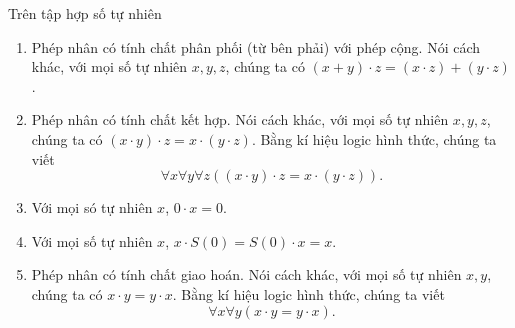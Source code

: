 \begin{theorem}\label{theorem:property-of-natural-numbers-multiplication}
	Trên tập hợp số tự nhiên
	\begin{enumerate}[label={(\roman*)}]
		\item Phép nhân có tính chất phân phối (từ bên phải) với phép cộng. Nói cách khác, với mọi số tự nhiên $x, y, z$, chúng ta có $(x + y)\cdot z = (x\cdot z) + (y\cdot z)$.
		\item Phép nhân có tính chất kết hợp. Nói cách khác, với mọi số tự nhiên $x, y, z$, chúng ta có $(x \cdot y) \cdot z = x \cdot (y \cdot z)$. Bằng kí hiệu logic hình thức, chúng ta viết
		      \[
			      \forall x\forall y\forall z \left( (x \cdot y) \cdot z = x \cdot (y \cdot z) \right).
		      \]
		\item Với mọi só tự nhiên $x$, $0\cdot x = 0$.
		\item Với mọi số tự nhiên $x$, $x\cdot S(0) = S(0) \cdot x = x$.
		\item Phép nhân có tính chất giao hoán. Nói cách khác, với mọi số tự nhiên $x, y$, chúng ta có $x \cdot y = y \cdot x$. Bằng kí hiệu logic hình thức, chúng ta viết
		      \[
			      \forall x\forall y \left( x \cdot y = y \cdot x \right).
		      \]
	\end{enumerate}
\end{theorem}

